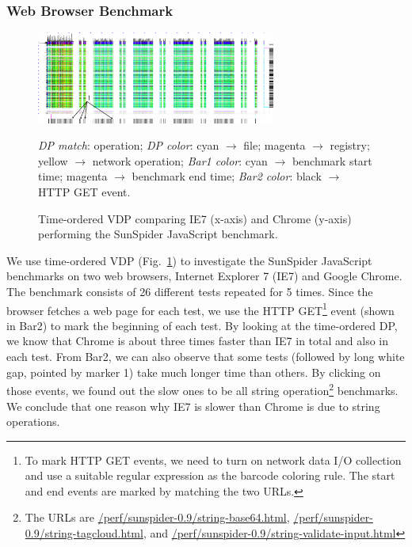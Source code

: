 \subsubsection{Web Browser Benchmark}
\label{sec:wbbench}

\begin{figure}[htb]
\begin{center}
\includegraphics[width=0.7\textwidth]{lviz/wbbench-dp.png}
\end{center}
\caption{Time-ordered VDP comparing IE7 (x-axis) and Chrome (y-axis)
performing the
SunSpider JavaScript benchmark.
}
\label{fig:wbbench-dp}
{\it DP match}: operation;
{\it DP color}: cyan $\rightarrow$ file; magenta $\rightarrow$ registry;
yellow $\rightarrow$ network operation;
{\it Bar1 color}: cyan $\rightarrow$ benchmark start time;
magenta $\rightarrow$ benchmark end time;
{\it Bar2 color}: black $\rightarrow$ HTTP GET event.
\end{figure}

We use time-ordered VDP (Fig.~\ref{fig:wbbench-dp}) to investigate the
SunSpider JavaScript benchmarks on
two web browsers, Internet Explorer 7 (IE7) and Google Chrome.
The benchmark consists of 26 different tests repeated for 5 times.
Since the browser fetches a web page for each test,
we use the HTTP GET\footnote{
To mark HTTP GET events, we need to turn on network data I/O collection
and use a suitable regular expression as the barcode coloring rule.
The start and end events are marked by matching the two URLs.
}
event (shown in Bar2) to mark the beginning
of each test.
By looking at the time-ordered DP, we know that Chrome is about three
times faster than IE7 in total and also in each test.
From Bar2,
we can also observe that some tests (followed by long white gap,
pointed by marker 1) take much longer time than others.
By clicking on those events, we found out the slow ones to be all string
operation\footnote{
The URLs are \url{/perf/sunspider-0.9/string-base64.html},
\url{/perf/sunspider-0.9/string-tagcloud.html},
and \url{/perf/sunspider-0.9/string-validate-input.html}}
benchmarks.
We conclude that one reason why IE7 is slower than Chrome is due to string operations.
